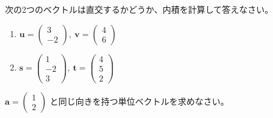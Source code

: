 \begin{quiz}
次の2つのベクトルは直交するかどうか、内積を計算して答えなさい。
\begin{enumerate}
\item $\bm{u} = \begin{pmatrix} 3 \\ -2 \end{pmatrix},\ \bm{v} = \begin{pmatrix} 4 \\ 6 \end{pmatrix}$
\item $\bm{s} = \begin{pmatrix} 1 \\ -2 \\ 3 \end{pmatrix},\ \bm{t} = \begin{pmatrix} 4 \\ 5 \\ 2 \end{pmatrix}$
\end{enumerate}
\end{quiz}

\begin{quiz}
$\bm{a} = \begin{pmatrix} 1 \\ 2 \end{pmatrix}$ と同じ向きを持つ単位ベクトルを求めなさい。
\end{quiz}